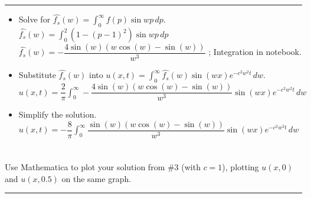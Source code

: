 \documentclass[10pt]{article}
\begin{document}
\hrule 

\vspace{7.5mm}

\begin{itemize}
    \item Solve for $ \displaystyle \hat{f_{s}}(w) = \int_{0}^{\infty} f(p)\sin{wp} \,dp $.
    \subitem $ \displaystyle \hat{f_{s}}(w) = \int_{0}^{2} (1-(p-1)^2)\sin{wp} \,dp $
    \subitem $ \displaystyle \hat{f_{s}}(w) = -\dfrac{4\sin{(w)}(w\cos{(w)} -\sin{(w)})}{w^{3}} $ ; Integration in notebook. 
    \item Substitute $ \hat{f_{s}}(w) $ into $ \displaystyle u(x,t) = \int_{0}^{\infty} \hat{f_{s}}(w) \sin{(wx)} e^{-c^2w^2t} \, dw $.
    \subitem $  \displaystyle u(x,t) = \dfrac{2}{\pi} \int_{0}^{\infty} -\dfrac{4\sin{(w)}(w\cos{(w)} -\sin{(w)})}{w^{3}} \sin{(wx)} e^{-c^2w^2t} \, dw $
    \item Simplify the solution.
    \subitem $  \displaystyle u(x,t) = -\dfrac{8}{\pi} \int_{0}^{\infty} \dfrac{\sin{(w)}(w\cos{(w)} -\sin{(w)})}{w^{3}} \sin{(wx)} e^{-c^2w^2t} \, dw $
\end{itemize}

\newpage


\section{\underline{}}
\label{sec: Problem 4}

\noindent
Use Mathematica to plot your solution from \#3 (with $ c = 1 $), 
plotting $ u(x,0) $ and $ u(x,0.5) $ on the same graph. \\
\vspace{2.5mm}

\hrule 

\vspace{7.5mm}
\end{document}
